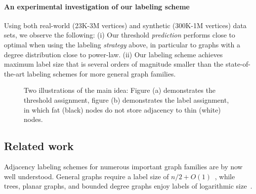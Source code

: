 \paragraph{An experimental investigation  of our labeling scheme}
Using both real-world (23K-3M vertices) and synthetic (300K-1M vertices) data sets, we observe the following:
(i) Our threshold \emph{prediction} performs close to optimal when using the labeling \emph{strategy} above, in particular to graphs with  a degree distribution  close to  power-law. 
(ii) Our labeling scheme achieves maximum label size that is several orders of magnitude smaller than the state-of-the-art labeling schemes for more general graph families.


\begin{figure}
\centering
{}
\caption{Two illustrations of the main idea: Figure (a) demonstrates the threshold assignment, figure (b) demonstrates the label assignment, in which fat (black) nodes do not store adjacency to thin (white) nodes.}
    \label{f:principle}
\end{figure}

\subsection{Related work}
Adjacency labeling schemes for  numerous important graph families are by now well understood. 
General graphs  require a label size of $n/2+O(1)$~\cite{moon1965minimal, alstrup2014adjacency}, while 
trees, planar graphs, and bounded degree graphs enjoy labels of logarithmic size~\cite{Alstrup02, gavoille2007shorter, adjiashvili2014labeling}. 

